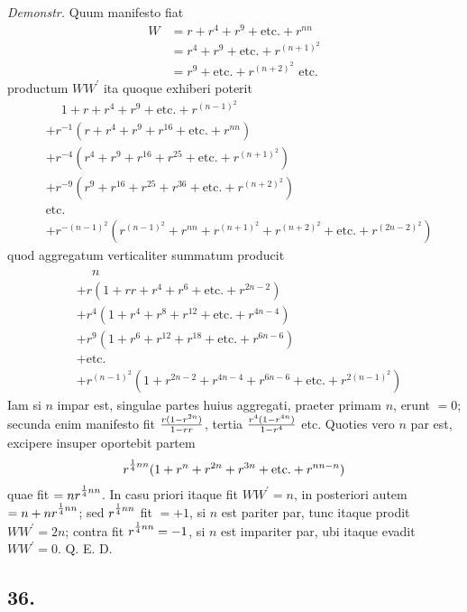 \documentclass[twoside,12pt]{memoir}
\let\oldfrac\frac
\def\frac#1#2{\mathchoice{\tfrac{#1}{#2}}{\oldfrac{#1}{#2}}{\genfrac{}{}{}{2}{#1}{#2\mathstrut}}{\genfrac{}{}{}{3}{#1}{#2\mathstrut}}}
\begin{document}
\textit{Demonstr.} Quum manifesto fiat
\[\begin{aligned}
W & =r+r^{4}+r^{9}+\text{etc.}+r^{n n} \\
& =r^{4}+r^{9}+\text{etc.}+r^{(n+1)^{2}} \\
& =r^{9}+\text{etc.}+r^{(n+2)^{2}} \text{ etc.}
\end{aligned}\]
productum \(W {W}^{\prime}\) ita quoque exhiberi poterit
\[\begin{aligned}
&\phantom{ +, } 1+r+r^{4}+r^{9}+\text{etc.}+r^{(n-1)^{2}} \\
&+ r^{-1}(r+r^{4}+r^{9}+r^{16}+\text{etc.}+r^{n n}) \\
&+ r^{-4}(r^{4}+r^{9}+r^{16}+r^{25}+\text{etc.}+r^{(n+1)^{2}}) \\
&+ r^{-9}(r^{9}+r^{16}+r^{25}+r^{36}+\text{etc.}+r^{(n+2)^{2}}) \\
&\text{etc.} \\
&+ r^{-(n-1)^{2}}(r^{(n-1)^{2}}+r^{n n}+r^{(n+1)^{2}}+r^{(n+2)^{2}}+\text{etc.}+r^{(2 n-2)^{2}})
\end{aligned}\]
quod aggregatum verticaliter summatum producit
\[\begin{aligned}
&\phantom{+}n \\
&+r(1+r r+r^{4}+r^{6}+\text{etc.}+r^{2 n-2}) \\
&+r^{4}(1+r^{4}+r^{8}+r^{12}+\text{etc.}+r^{4 n-4}) \\
&+r^{9}(1+r^{6}+r^{12}+r^{18}+\text{etc.}+r^{6 n-6}) \\
&+\text{etc.} \\
&+r^{(n-1)^{2}}(1+r^{2 n-2}+r^{4 n-4}+r^{6 n-6}+\text{etc.}+r^{2(n-1)^{2}})
\end{aligned}\]
Iam si \(n\) impar est, singulae partes huius aggregati, praeter primam \(n\), erunt \(=0\); secunda enim manifesto fit \(\frac{r(1-r^{2 n})}{1-r r}\), tertia \(\frac{r^{4}(1-r^{4 n})}{1-r^{4}}\) etc. Quoties vero \(n\) par est, excipere insuper oportebit partem\pagebreak%
\[r^{\frac{1}{4} n n}(1+r^{n}+r^{2 n}+r^{3 n}+\text{etc.}+r^{n n-n})\]
quae fit \(=n r^{\frac{1}{4} n n}\). In casu priori itaque fit \(W W^{\prime}=n\), in posteriori autem \(=n+n r^{\frac{1}{4} n n}\); sed \(r^{\frac{1}{4} n n}\) fit \(=+1\), si \(n\) est pariter par, tunc itaque prodit \(W W^{\prime}=2 n\); contra fit \(r^{\frac{1}{4} n n}=-1\), si \(n\) est impariter par, ubi itaque evadit \(W W^{\prime}=0\). Q. E. D.

\subsection*{36.}
 
\end{document}
